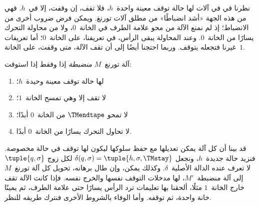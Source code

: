 \documentclass[../../../include/open-logic-section]{subfiles}
\begin{document}

\begin{explain}
نظرنا في  في آلات لها حالة توقف معينة واحدة~$h$، فلا تقف، إن وقفت، إلا في~$h$. فهي من هذه الجهة «أشد انضباطًا» من مطلق آلات تورنغ. ويمكن فرض ضروب أخرى من الانضباط؛ إذ لم نمنع الآلة من محو علامة الطرف في الخانة~$0$، ولا من محاولة التحرك يسارًا من الخانة~$0$. وعند المحاولة يبقى الرأس، في تعريفنا، على الخانة~$0$؛ أما تعريفات غيرنا فتجعله يتوقف. وربما احتجنا أيضًا إلى أن تقف الآلة، متى وقفت، على الخانة~$1$.
\end{explain}

\begin{defn}
آلة تورنغ~$M$ \emph{منضبطة} إذا وفقط إذا استوفت:
\begin{enumerate}
\item لها حالة توقف معينة وحيدة~$h$؛
\item لا تقف إلا وهي تمسح الخانة~$1$؛
\item لا تمحو $\TMendtape$ من الخانة~$0$ أبدًا؛
\item لا تحاول التحرك يسارًا من الخانة~$0$ أبدًا.
\end{enumerate}
\end{defn}

\begin{explain}
قد بينا أن كل آلة يمكن تعديلها مع حفظ سلوكها ليكون لها توقف في حالة مخصوصة. فنزيد حالة جديدة~$h$، ونجعل $\delta(q,\sigma)=\tuple{h,\sigma,\TMstay}$ لكل زوج $\tuple{q,\sigma}$ لا تعرف عنده الدالة الأصلية~$\delta$. وكذلك يمكن، وإن طال برهانه، تحويل كل آلة تورنغ~$M$ إلى آلة منضبطة~$M'$، لها مدخلات التوقف نفسها والخرج نفسه. فإذا كانت الآلة تقف خارج الخانة~$1$ مثلًا، ألحقنا بها تعليمات ترد الرأس يسارًا حتى علامة الطرف، ثم يمينًا خانة واحدة، ثم توقفه. وأما الوفاء بالشروط الأخرى فنترك طريقه للنظر.
\end{explain}
\end{document}
